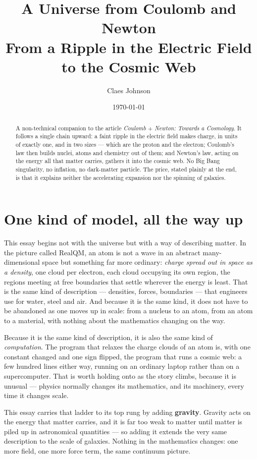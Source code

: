 \documentclass[11pt]{article}
\title{\textbf{A Universe from Coulomb and Newton}\\[0.3em]
\large From a Ripple in the Electric Field to the Cosmic Web}
\author[ ]{Claes Johnson}
\affil[ ]{KTH Royal Institute of Technology, Stockholm \quad\texttt{claesjohnson@gmail.com}}
\date{\today}
\begin{document}
\maketitle
{}

\begin{abstract}
\noindent A non-technical companion to the article \emph{Coulomb $+$ Newton: Towards a Cosmology}. It follows a
single chain upward: a faint ripple in the electric field makes charge, in units of exactly one, and in two sizes
--- which are the proton and the electron; Coulomb's law then builds nuclei, atoms and chemistry out of them; and
Newton's law, acting on the energy all that matter carries, gathers it into the cosmic web. No Big Bang
singularity, no inflation, no dark-matter particle. The price, stated plainly at the end, is that it explains
neither the accelerating expansion nor the spinning of galaxies.
\end{abstract}

\section*{One kind of model, all the way up}
This essay begins not with the universe but with a way of describing matter. In the picture called RealQM, an atom
is not a wave in an abstract many-dimensional space but something far more ordinary: \emph{charge spread out in
space as a density}, one cloud per electron, each cloud occupying its own region, the regions meeting at free
boundaries that settle wherever the energy is least. That is the same kind of description --- densities, forces,
boundaries --- that engineers use for water, steel and air. And because it is the same kind, it does not have to be
abandoned as one moves up in scale: from a nucleus to an atom, from an atom to a material, with nothing about the
mathematics changing on the way.

Because it is the same kind of description, it is also the same kind of \emph{computation}. The program that
relaxes the charge clouds of an atom is, with one constant changed and one sign flipped, the program that runs a
cosmic web: a few hundred lines either way, running on an ordinary laptop rather than on a supercomputer. That is
worth holding onto as the story climbs, because it is unusual --- physics normally changes its mathematics, and its
machinery, every time it changes scale.

This essay carries that ladder to its top rung by adding \textbf{gravity}. Gravity acts on the energy that matter
carries, and it is far too weak to matter until matter is piled up in astronomical quantities --- so adding it
extends the very same description to the scale of galaxies. Nothing in the mathematics changes: one more field, one
more force term, the same continuum picture.
\end{document}
